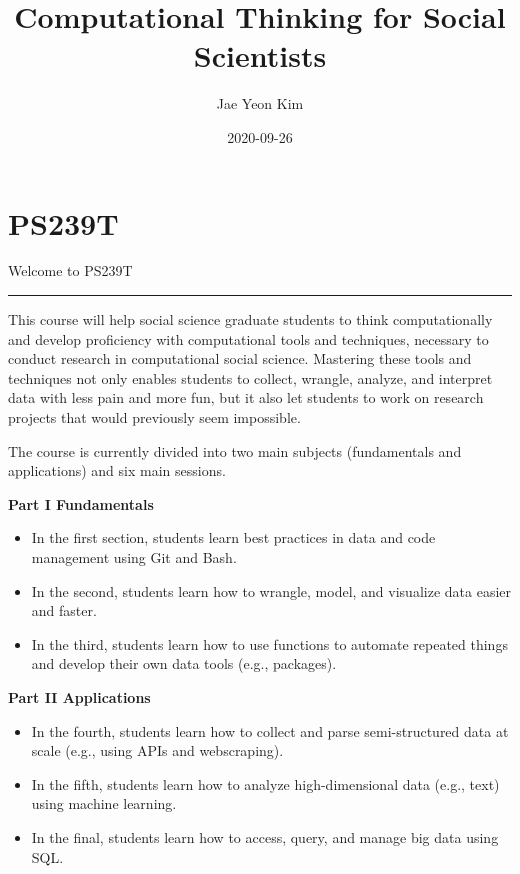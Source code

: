 \documentclass[
]{book}
\title{Computational Thinking for Social Scientists}
\author{Jae Yeon Kim}
\date{2020-09-26}
\begin{document}
\maketitle

{
\setcounter{tocdepth}{1}
\tableofcontents
}
\hypertarget{ps239t}{%
\chapter{PS239T}\label{ps239t}}

Welcome to PS239T

\begin{center}\rule{0.5\linewidth}{0.5pt}\end{center}

This course will help social science graduate students to think computationally and develop proficiency with computational tools and techniques, necessary to conduct research in computational social science. Mastering these tools and techniques not only enables students to collect, wrangle, analyze, and interpret data with less pain and more fun, but it also let students to work on research projects that would previously seem impossible.

The course is currently divided into two main subjects (fundamentals and applications) and six main sessions.

\textbf{Part I Fundamentals}

\begin{itemize}
\item
  In the first section, students learn best practices in data and code management using Git and Bash.
\item
  In the second, students learn how to wrangle, model, and visualize data easier and faster.
\item
  In the third, students learn how to use functions to automate repeated things and develop their own data tools (e.g., packages).
\end{itemize}

\textbf{Part II Applications}

\begin{itemize}
\item
  In the fourth, students learn how to collect and parse semi-structured data at scale (e.g., using APIs and webscraping).
\item
  In the fifth, students learn how to analyze high-dimensional data (e.g., text) using machine learning.
\item
  In the final, students learn how to access, query, and manage big data using SQL.
\end{itemize}
\end{document}
